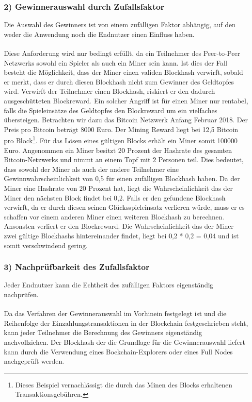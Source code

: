 \subsubsection{2) Gewinnerauswahl durch Zufallsfaktor}
Die Auswahl des Gewinners ist von einem zufälligen Faktor abhängig, auf den weder die Anwendung noch die Endnutzer einen Einfluss haben.\\\\
Diese Anforderung wird nur bedingt erfüllt, da ein Teilnehmer des Peer-to-Peer Netzwerks sowohl ein Spieler als auch ein Miner sein kann. Ist dies der Fall besteht die Möglichkeit, dass der Miner einen validen Blockhash verwirft, sobald er merkt, dass er durch diesen Blockhash nicht zum Gewinner des Geldtopfes wird. Verwirft der Teilnehmer einen Blockhash, riskiert er den dadurch ausgeschütteten Blockreward. Ein solcher Angriff ist für einen Miner nur rentabel, falls die Spieleinsätze des Geldtopfes den Blockreward um ein vielfaches übersteigen.
Betrachten wir dazu das Bitcoin Netzwerk Anfang Februar 2018. Der Preis pro Bitcoin beträgt 8000 Euro. Der Mining Reward liegt bei 12,5 Bitcoin pro Block\footnote{Dieses Beispiel vernachlässigt die durch das Minen des Blocks erhaltenen Transaktionsgebühren.}. Für das Lösen eines gültigen Blocks erhält ein Miner somit 100000 Euro. Angenommen ein Miner besitzt 20 Prozent der Hashrate des gesamten Bitcoin-Netzwerks und nimmt an einem Topf mit 2 Personen teil. Dies bedeutet, dass sowohl der Miner als auch der andere Teilnehmer eine Gewinnwahrscheinlichkeit von 0,5 für einen zufälligen Blockhash haben.
Da der Miner eine Hashrate von 20 Prozent hat, liegt die Wahrscheinlichkeit das der Miner den nächsten Block findet bei 0,2. Falls er den gefundene Blockhash verwirft, da er durch diesen seinen Glücksspieleinsatz verlieren würde, muss er es schaffen vor einem anderen Miner einen weiteren Blockhash zu berechnen. Ansonsten verliert er den Blockreward. Die Wahrscheinlichkeit das der Miner zwei gültige Blockhashs hintereinander findet, liegt bei 0,2 * 0,2 = 0,04 und ist somit verschwindend gering.

\subsubsection{3) Nachprüfbarkeit des Zufallsfaktor}
Jeder Endnutzer kann die Echtheit des zufälligen Faktors eigenständig nachprüfen.\\\\
Da das Verfahren der Gewinnerauswahl im Vorhinein festgelegt ist und die Reihenfolge der Einzahlungstransaktionen in der Blockchain festgeschrieben steht, kann jeder Teilnehmer die Berechnung des Gewinners eigenständig nachvollziehen. Der Blockhash der die Grundlage für die Gewinnerauswahl liefert kann durch die Verwendung eines Bockchain-Explorers oder eines Full Nodes nachgeprüft werden. 
